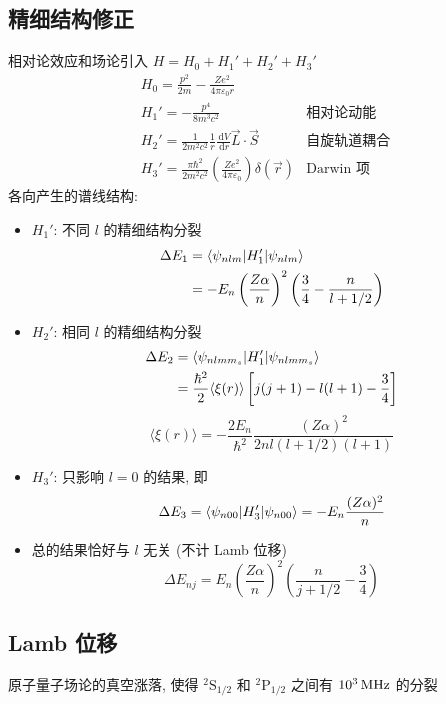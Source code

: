 \documentclass[10pt,a4paper,twocolumn]{article} %
\numberwithin{equation}{section} %
\newcommand{\dif}{\,\mathrm d}
\begin{document}
\subsection{精细结构修正} %
\label{sub:fin_str}
相对论效应和场论引入 $H = H_0 + H_1' + H_2' + H_3'$
\begin{align}
	& H_0 = \frac{p^2}{2m} - \frac{Z e^2}{4\pi\varepsilon_0 r} \\
	& H_1' = -\frac{p^4}{8m^3c^2} 
	&\mbox{相对论动能}\\
	& H_2' = \frac 1{2m^2c^2} \frac 1r\frac{\dif V}{\dif r}\vec L\cdot\vec S \
	&\mbox{自旋轨道耦合}\\
	& H_3' = \frac{\pi\hbar^2}{2m^2c^2}\left(
	\frac{Ze^2}{4\pi\varepsilon_0}\right)\delta(\vec r)
	&\mbox{Darwin 项}
\end{align}
各向产生的谱线结构:
\begin{itemize}
	\item $H_1'$: 不同 $l$ 的精细结构分裂
	\begin{align}
		\Delta E_1 &= \braket{\psi_{nlm}|H_1'|\psi_{nlm}} \\
		&= -E_n\left(\frac{Z\alpha}{n}\right)^2
		\left(\frac 34 - \frac{n}{l+1/2}\right)
	\end{align}
	\item $H_2'$: 相同 $l$ 的精细结构分裂
	\begin{align}
		\Delta E_2 &= \braket{\psi_{nlmm_s}|H_1'|\psi_{nlmm_s}} \\
		&= \frac{\hbar^2}{2}\langle \xi(r) \rangle 
		\left[j(j+1) - l(l+1) - \frac 34\right]
	\end{align}
	\begin{equation}
		\langle \xi(r) \rangle = -\frac{2E_n}{\hbar^2}
		\frac{(Z\alpha)^2}{2nl(l+1/2)(l+1)}
	\end{equation}
	\item $H_3'$: 只影响 $l = 0$ 的结果, 即
	\begin{equation}
		\Delta E_3 = \braket{\psi_{n00}|H_3'|\psi_{n00}} 
		= -E_n\frac{(Z\alpha)^2}{n}
	\end{equation}
	\item 总的结果恰好与 $l$ 无关 (不计 Lamb 位移)
	\begin{equation}
		\Delta E_{nj} = E_n\left(\frac{Z\alpha}{n}\right)^2
		\left(\frac{n}{j+1/2} - \frac 34\right)
	\end{equation}
\end{itemize}
\subsection{Lamb 位移} %
\label{sub:lamb_shift}
原子量子场论的真空涨落, 使得 $^2\mathrm S_{1/2}$ 和 $^2\mathrm P_{1/2}$ 
之间有 $\SI{E3}{MHz}$ 的分裂
\end{document}
